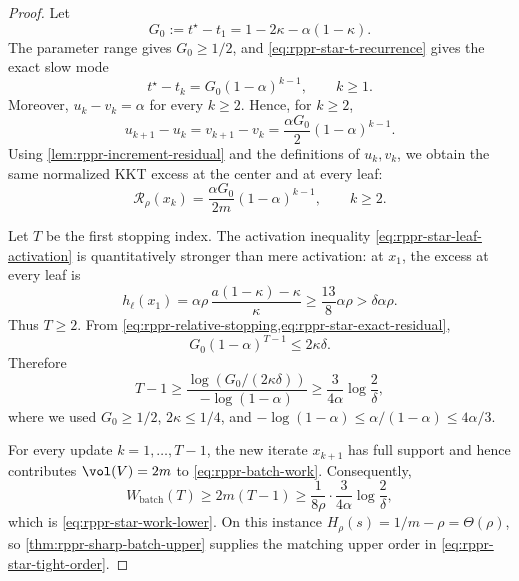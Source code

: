 \begin{proof}
Let
\begin{equation}
    G_0
    :=t^\star-t_1
    =1-2\kappa-\alpha(1-\kappa).
    \label{eq:rppr-star-G0}
\end{equation}
The parameter range gives \(G_0\geq1/2\), and
\cref{eq:rppr-star-t-recurrence} gives the exact slow mode
\begin{equation}
    t^\star-t_k
    =G_0(1-\alpha)^{k-1},
    \qquad k\geq1.
    \label{eq:rppr-star-slow-mode}
\end{equation}
Moreover, \(u_k-v_k=\alpha\) for every \(k\geq2\).  Hence, for
\(k\geq2\),
\begin{equation}
    u_{k+1}-u_k
    =v_{k+1}-v_k
    =\frac{\alpha G_0}{2}(1-\alpha)^{k-1}.
    \label{eq:rppr-star-equal-increments}
\end{equation}
Using \cref{lem:rppr-increment-residual} and the definitions of \(u_k,v_k\),
we obtain the same normalized KKT excess at the center and at every leaf:
\begin{equation}
    \mathcal{R}_\rho(x_k)
    =
    \frac{\alpha G_0}{2m}(1-\alpha)^{k-1},
    \qquad k\geq2.
    \label{eq:rppr-star-exact-residual}
\end{equation}

Let \(T\) be the first stopping index.  The activation inequality
\cref{eq:rppr-star-leaf-activation} is quantitatively stronger than mere
activation: at \(x_1\), the excess at every leaf is
\[
    h_\ell(x_1)
    =
    \alpha\rho\,
    \frac{a(1-\kappa)-\kappa}{\kappa}
    \geq
    \frac{13}{8}\alpha\rho
    >
    \delta\alpha\rho.
\]
Thus \(T\geq2\).  From
\cref{eq:rppr-relative-stopping,eq:rppr-star-exact-residual},
\begin{equation}
    G_0(1-\alpha)^{T-1}
    \leq2\kappa\delta.
    \label{eq:rppr-star-stop-inequality}
\end{equation}
Therefore
\begin{equation}
    T-1
    \geq
    \frac{\log(G_0/(2\kappa\delta))}
         {-\log(1-\alpha)}
    \geq
    \frac{3}{4\alpha}\log\frac2\delta,
    \label{eq:rppr-star-iteration-lower}
\end{equation}
where we used \(G_0\geq1/2\), \(2\kappa\leq1/4\), and
\(-\log(1-\alpha)\leq\alpha/(1-\alpha)\leq4\alpha/3\).

For every update \(k=1,\ldots,T-1\), the new iterate \(x_{k+1}\) has full
support and hence contributes \(\vol(V)=2m\) to
\cref{eq:rppr-batch-work}.  Consequently,
\[
    W_{\mathrm{batch}}(T)
    \geq2m(T-1)
    \geq
    \frac1{8\rho}\cdot
    \frac{3}{4\alpha}\log\frac2\delta,
\]
which is \cref{eq:rppr-star-work-lower}.  On this instance
\(H_\rho(s)=1/m-\rho=\Theta(\rho)\), so
\cref{thm:rppr-sharp-batch-upper} supplies the matching upper order in
\cref{eq:rppr-star-tight-order}.
\end{proof}

